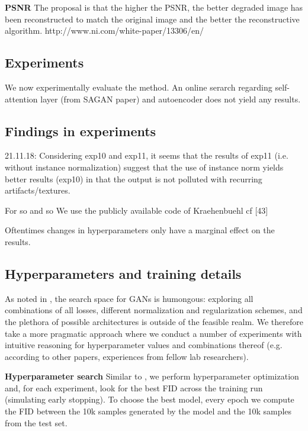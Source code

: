 \documentclass[11pt,a4paper]{article}
\begin{document}
\par \textbf{PSNR} The proposal is that the higher the PSNR, the better degraded image has been reconstructed to match the original image and the better the reconstructive algorithm.
http://www.ni.com/white-paper/13306/en/
    
\subsection{Experiments}
We now experimentally evaluate the method. An online serarch regarding self-attention layer (from SAGAN paper) and autoencoder does not yield any results.

\subsection{Findings in experiments}
21.11.18: Considering exp10 and exp11, it seems that the results of exp11 (i.e. without instance normalization) suggest that the use of instance norm yields better results (exp10) in that the output is not polluted with recurring artifacts/textures.

\par For so and so We use the publicly available code of Kraehenbuehl cf [43]

\par Oftentimes changes in hyperparameters only have a marginal effect on the results.

\subsection{Hyperparameters and training details}
As noted in \cite{1807.04720}, the search space for GANs is humongous: exploring all combinations of all losses, different normalization and regularization schemes, and the plethora of possible architectures is outside of the feasible realm. We therefore take a more pragmatic approach where we conduct a number of experiments with intuitive reasoning for hyperparameter values and combinations thereof (e.g. according to other papers, experiences from fellow lab researchers).

\textbf{Hyperparameter search} Similar to \cite{1711.10337}, we perform hyperparameter optimization and, for each experiment, look for the best FID across the training run (simulating early stopping). To choose the best model, every
epoch we compute the FID between the 10k samples generated by the model and the 10k samples from the test set.
\end{document}
